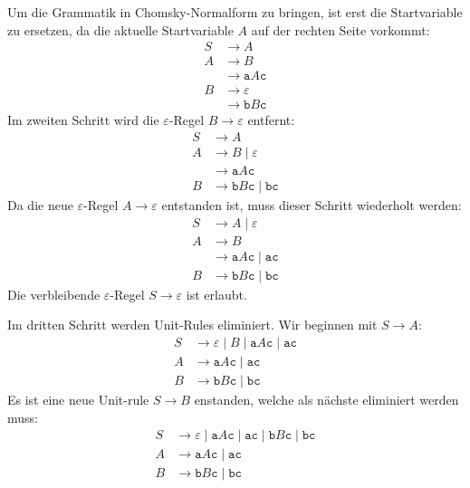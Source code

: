 \begin{loesung}
\begin{teilaufgaben}
{Um die Grammatik in Chomsky-Normalform zu bringen, ist erst die Startvariable
zu ersetzen, da die aktuelle Startvariable $A$ auf der rechten Seite vorkommt:
\begin{align*}
S&\rightarrow A\\
A&\rightarrow B \\
 &\rightarrow \texttt{a} A \texttt{c} \\
B&\rightarrow \varepsilon \\
 &\rightarrow \texttt{b} B \texttt{c}
\end{align*}
Im zweiten Schritt wird die $\varepsilon$-Regel $B\to\varepsilon$ entfernt:
\begin{align*}
S&\rightarrow A\\
A&\rightarrow B \;|\; \varepsilon\\
 &\rightarrow \texttt{a} A \texttt{c} \\
B&\rightarrow \texttt{b} B \texttt{c} \;|\; \texttt{b} \texttt{c}
\end{align*}
Da die neue $\varepsilon$-Regel $A\to\varepsilon$ entstanden ist, muss
dieser Schritt wiederholt werden:
\begin{align*}
S&\rightarrow A \;|\; \varepsilon\\
A&\rightarrow B \\
 &\rightarrow \texttt{a} A \texttt{c} \;|\; \texttt{ac}\\
B&\rightarrow \texttt{b} B \texttt{c} \;|\; \texttt{b} \texttt{c}
\end{align*}
Die verbleibende $\varepsilon$-Regel $S\to\varepsilon$ ist erlaubt.

Im dritten Schritt werden Unit-Rules eliminiert.
Wir beginnen mit $S\to A$:
\begin{align*}
S&\rightarrow \varepsilon \;|\; B \;|\; \texttt{a}A\texttt{c} \;|\;\texttt{ac}\\
A&\rightarrow \texttt{a} A \texttt{c} \;|\; \texttt{ac}\\
B&\rightarrow \texttt{b} B \texttt{c} \;|\; \texttt{b} \texttt{c}
\end{align*}
Es ist eine neue Unit-rule $S\to B$ enstanden, welche als nächste eliminiert
werden muss:
\begin{align*}
S&\rightarrow \varepsilon \;|\; \texttt{a}A\texttt{c} \;|\;\texttt{ac}
\;|\; \texttt{b} B \texttt{c} \;|\; \texttt{b} \texttt{c}
\\
A&\rightarrow \texttt{a} A \texttt{c} \;|\; \texttt{ac}\\
B&\rightarrow \texttt{b} B \texttt{c} \;|\; \texttt{b} \texttt{c}
\end{align*}

}
\end{teilaufgaben}
\end{loesung}
